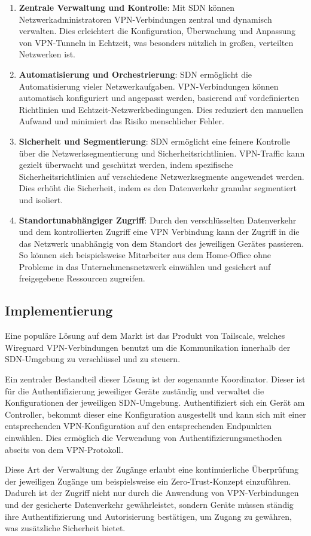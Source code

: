 \begin{enumerate}
    \item \textbf{Zentrale Verwaltung und Kontrolle}: Mit \gls{SDN} können Netzwerkadministratoren VPN-Verbindungen zentral und dynamisch verwalten. Dies erleichtert die Konfiguration, Überwachung und Anpassung von VPN-Tunneln in Echtzeit, was besonders nützlich in großen, verteilten Netzwerken ist.
    \item \textbf{Automatisierung und Orchestrierung}: \gls{SDN} ermöglicht die Automatisierung vieler Netzwerkaufgaben. VPN-Verbindungen können automatisch konfiguriert und angepasst werden, basierend auf vordefinierten Richtlinien und Echtzeit-Netzwerkbedingungen. Dies reduziert den manuellen Aufwand und minimiert das Risiko menschlicher Fehler.
    \item \textbf{Sicherheit und Segmentierung}: \gls{SDN} ermöglicht eine feinere Kontrolle über die Netzwerksegmentierung und Sicherheitsrichtlinien. VPN-Traffic kann gezielt überwacht und geschützt werden, indem spezifische Sicherheitsrichtlinien auf verschiedene Netzwerksegmente angewendet werden. Dies erhöht die Sicherheit, indem es den Datenverkehr granular segmentiert und isoliert.
    \item \textbf{Standortunabhängiger Zugriff}: Durch den verschlüsselten Datenverkehr und dem kontrollierten Zugriff eine VPN Verbindung kann der Zugriff in die das Netzwerk unabhängig von dem Standort des jeweiligen Gerätes passieren. So können sich beispielsweise Mitarbeiter aus dem Home-Office ohne Probleme in das Unternehmensnetzwerk einwählen und gesichert auf freigegebene Ressourcen zugreifen.
\end{enumerate}

\subsection{Implementierung}

Eine populäre Lösung auf dem Markt ist das Produkt von Tailscale, welches Wireguard VPN-Verbindungen benutzt um die Kommunikation innerhalb der \gls{SDN}-Umgebung zu verschlüssel und zu steuern.

Ein zentraler Bestandteil dieser Lösung ist der sogenannte Koordinator. Dieser ist für die Authentifizierung jeweiliger Geräte zuständig und verwaltet die Konfigurationen der jeweiligen \gls{SDN}-Umgebung. Authentifiziert sich ein Gerät am Controller, bekommt dieser eine Konfiguration ausgestellt und kann sich mit einer entsprechenden VPN-Konfiguration auf den entsprechenden Endpunkten einwählen. Dies ermöglich die Verwendung von Authentifizierungsmethoden abseits von dem VPN-Protokoll. \cite{tailscale202_how_it_works}

Diese Art der Verwaltung der Zugänge erlaubt eine kontinuierliche Überprüfung der jeweiligen Zugänge um beispielsweise ein Zero-Trust-Konzept einzuführen. Dadurch ist der Zugriff nicht nur durch die Anwendung von VPN-Verbindungen und der gesicherte Datenverkehr gewährleistet, sondern Geräte müssen ständig ihre Authentifizierung und Autorisierung bestätigen, um Zugang zu gewähren, was zusätzliche Sicherheit bietet. \cite{Tailscale_ZeroTrust, NIST_ZeroTrust}